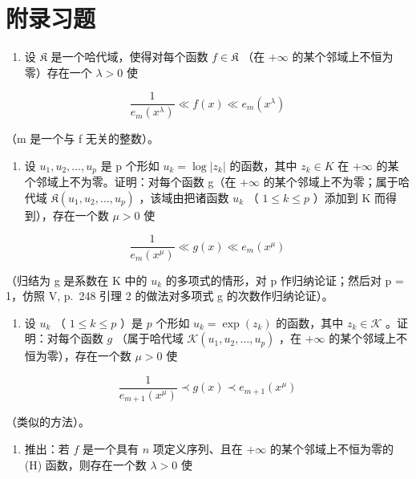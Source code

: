 \section*{附录习题}
{}

\begin{enumerate}
\def\labelenumi{\arabic{enumi})}
\tightlist
\item
  设 \(\mathfrak{K}\) 是一个哈代域，使得对每个函数 \(f\in \mathfrak{K}\) （在 \(+\infty\) 的某个邻域上不恒为零）存在一个 \(\lambda >0\) 使
\end{enumerate}

\[
\frac {1}{e _ {m} (x ^ {\lambda})} \ll f (x) \ll e _ {m} (x ^ {\lambda})
\]

（m 是一个与 f 无关的整数）。

\begin{enumerate}
\def\labelenumi{\alph{enumi})}
\tightlist
\item
  设 \(u_{1}, u_{2}, \ldots, u_{p}\) 是 p 个形如 \(u_{k} = \log |z_{k}|\) 的函数，其中 \(z_{k} \in K\) 在 \(+\infty\) 的某个邻域上不为零。证明：对每个函数 g（在 \(+\infty\) 的某个邻域上不为零；属于哈代域 \(\mathfrak{K}(u_{1}, u_{2}, \ldots, u_{p})\) ，该域由把诸函数 \(u_{k}\) （ \(1 \leqslant k \leqslant p\) ）添加到 K 而得到），存在一个数 \(\mu > 0\) 使
\end{enumerate}

\[
\frac {1}{e _ {m} (x ^ {\mu})} \ll g (x) \ll e _ {m} (x ^ {\mu})
\]

（归结为 g 是系数在 K 中的 \(u_{k}\) 的多项式的情形，对 p 作归纳论证；然后对 p = 1，仿照 V, p.~248 引理 2 的做法对多项式 g 的次数作归纳论证）。

\begin{enumerate}
\def\labelenumi{\alph{enumi})}
\setcounter{enumi}{1}
\tightlist
\item
  设 \(u_{k}\) （ \(1 \leqslant k \leqslant p\) ）是 \(p\) 个形如 \(u_{k} = \exp(z_{k})\) 的函数，其中 \(z_{k} \in \mathcal{K}\) 。证明：对每个函数 \(g\) （属于哈代域 \(\mathcal{K}(u_{1}, u_{2}, \ldots, u_{p})\) ，在 \(+\infty\) 的某个邻域上不恒为零），存在一个数 \(\mu > 0\) 使
\end{enumerate}

\[
\frac {1}{e _ {m + 1} (x ^ {\mu})} \prec g (x) \prec e _ {m + 1} (x ^ {\mu})
\]

（类似的方法）。

\begin{enumerate}
\def\labelenumi{\alph{enumi})}
\setcounter{enumi}{2}
\tightlist
\item
  推出：若 \(f\) 是一个具有 \(n\) 项定义序列、且在 \(+\infty\) 的某个邻域上不恒为零的 (H) 函数，则存在一个数 \(\lambda > 0\) 使
\end{enumerate}

